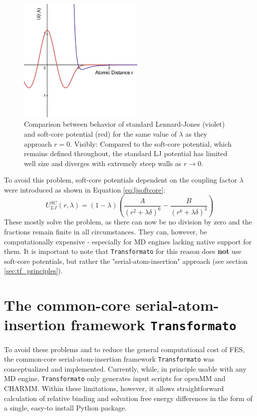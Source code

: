 \documentclass[oneside]{scrreprt}
\begin{document}
\begin{figure}
    \centering
    \includegraphics[height=6cm]{plots/LJandsoftcore.png}
    \caption[Comparison between behavior of standard LJ potentials vs. soft-core potentials]{Comparison between behavior of standard Lennard-Jones (violet) and soft-core potential (red) for the same value of $\lambda$ as they approach $r=0$. Visibly: Compared to the soft-core potential, which remains defined throughout, the standard LJ potential has limited well size and diverges with extremely steep walls as $r\to 0$.}
    \label{fig:ljandsoftcore}
\end{figure}

To avoid this problem, soft-core potentials dependent on the coupling factor $\lambda$ were introduced as shown in Equation \ref{eq:ljsoftcore}\cite{Beutler1994Jun}:
\begin{equation}
U_{LJ}^{SC}(r,\lambda)=(1-\lambda)(\frac{A}{(r^2 +\lambda \delta)^6 }-\frac{B}{(r^6 +\lambda \delta)^3})
\label{eq:ljsoftcore}
\end{equation}
These mostly solve the problem, as there can now be no division by zero and the fractions remain finite in all circumstances. They can, however, be computationally expensive  - especially for MD engines lacking native support for them\cite{Li2020Aug}. It is important to note that \texttt{Transformato} for this reason does \textbf{not} use soft-core potentials, but rather the "serial-atom-insertion" approach (see section \ref{sec:tf_principles}).


\section{The common-core serial-atom-insertion framework {\texttt{Transformato}}}
To avoid these problems and to reduce the general computational cost of FES, the common-core serial-atom-insertion framework \texttt{Transformato} was conceptualized and implemented\cite{karwounopoulos_relative_2022,braunsfeldImplementationTestingCHARMM,Wieder2022Jun}. 
Currently, while, in principle usable with any MD engine, \texttt{Transformato}  only generates input scripts for openMM\cite{Eastman2017Jul} and CHARMM\cite{Brooks2009Jul}. Within these limitations, however, it allows straightforward calculation of relative binding and solvation free energy differences in the form of a single, easy-to install Python package.
\end{document}
